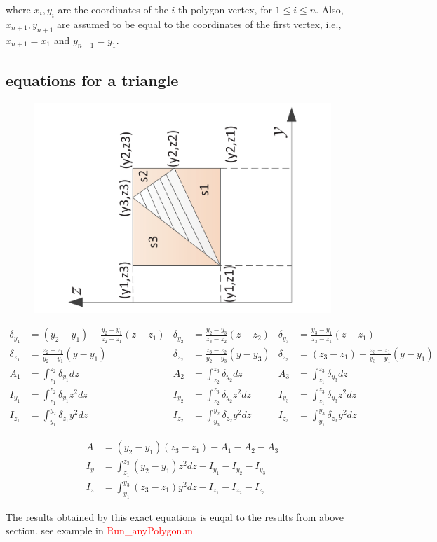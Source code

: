 where  $ x_{i},y_{i} $ are the coordinates of the $ i $-th polygon vertex, for $ 1\leq i\leq n $. Also, $ x_{n+1},y_{n+1} $ are assumed to be equal to the coordinates of the first vertex, i.e., $ x_{n+1}=x_{1} $ and $ y_{n+1}=y_{1} $.

\subsection{equations for a triangle}
\begin{figure}[h!]
\centering
\includegraphics[width=0.7\linewidth, angle=-90]{Figures/areaMomentsForTriangle}
\caption{}
\label{fig:areamomentsfortriangle}
\end{figure}

\begin{align*}
\delta_{y_1} &= (y_2-y_1)- \frac{y_2-y_1}{z_2-z_1} (z-z_1) & \delta_{y_2} &= \frac{y_2-y_3}{z_3-z_2} (z-z_2) & \delta_{y_3} &= \frac{y_3-y_1}{z_3-z_1} (z-z_1) \\
\delta_{z_1} &= \frac{z_2-z_1}{y_2-y_1} (y-y_1 ) & \delta_{z_2 } &= \frac{z_3-z_2}{y_2-y_3} (y-y_3) & \delta_{z_3} &= (z_3-z_1)- \frac{z_3-z_1}{y_3-y_1} (y-y_1) \\
A_1 &= \int_{z_1}^{z_2} \delta_{y_1} dz & A_2 &= \int_{z_2}^{z_3} \delta_{y_2} dz & A_3 &= \int_{z_1}^{z_3} \delta_{y_3} dz \\
I_{y_1} &=\int_{z_1}^{z_2} \delta_{y_1} z^2 dz & I_{y_2 } &= \int_{z_2}^{z_3} \delta_{y_2} z^2 dz & I_{y_3} &= \int_{z_1}^{z_3} \delta_{y_3} z^2 dz \\
I_{z_1} &= \int_{y_1}^{y_2} \delta_{z_1} y^2 dz & I_{z_2 } &= \int_{y_3}^{y_2} \delta_{z_2} y^2 dz & I_{z_3} &= \int_{y_1}^{y_3} \delta_{z_3} y^2 dz
\end{align*}

\begin{align*}
A &= (y_2-y_1)(z_3-z_1)-A_1-A_2-A_3 \\
I_y &= \int_{z_1}^{z_3}(y_2-y_1) z^2 dz - I_{y_1} - I_{y_2} - I_{y_3} \\
I_z &= \int_{y_1}^{y_3}(z_3-z_1) y^2 dz - I_{z_1} - I_{z_2} - I_{z_3}
\end{align*}

The results obtained by this exact equations is euqal to the results from above section. see example in \textcolor{red}{Run\_anyPolygon.m}
